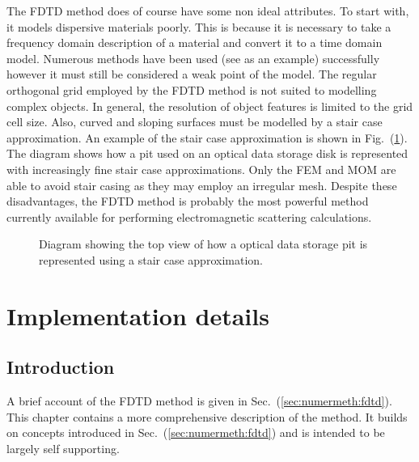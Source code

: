 \documentclass[a4paper, 12pt]{article}
\newcommand{\rfig}[1]{Fig.\ (\ref{#1})}
\newcommand{\sect}[1]{Sec.\ (\ref{#1})}
\begin{document}
	The FDTD method does of course have some non ideal attributes. To
	start with, it models dispersive materials poorly. This is because it is necessary to take a frequency domain
	description of a material and convert it to a time domain
	model. Numerous methods have been used (see
	\cite{luebbers90ieeetranseleccomp222} as an example) successfully
	however it must still be considered a weak point of the model. The
	regular orthogonal grid employed by the FDTD method is not suited to
	modelling complex objects. In general, the resolution of object
	features is limited to the grid cell size. Also, curved and sloping
	surfaces must be modelled by a stair case approximation. An example of
	the stair case approximation is shown in
	\rfig{fig:numermeth:staircase}. The diagram shows how a pit used on an
	optical data storage disk is represented with increasingly fine stair
	case approximations. Only the FEM and MOM are able to avoid stair
	casing as they may employ an irregular mesh. Despite these
	disadvantages, the FDTD method is probably the most powerful method
	currently available for performing electromagnetic scattering calculations.
	\begin{figure}[!h]
		\centering
		\caption{Diagram showing the top view of how a optical data storage
			pit is represented using a stair case approximation.}
		\label{fig:numermeth:staircase}
	\end{figure}
	\section{Implementation details}
	\subsection{Introduction}
	A brief account of the FDTD method is given in
	\sect{sec:numermeth:fdtd}. This chapter contains a more
	comprehensive description of the method. It builds on concepts
	introduced in \sect{sec:numermeth:fdtd} and is intended to be
	largely self supporting.
	
\end{document}
